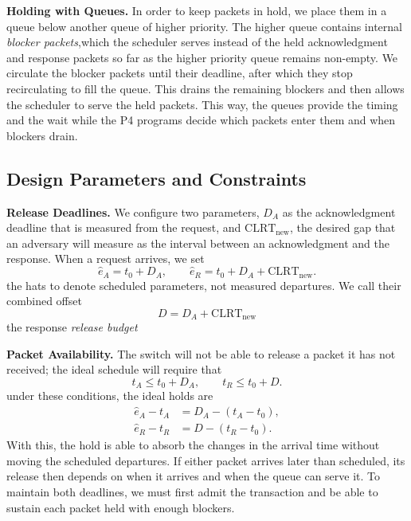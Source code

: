 \documentclass[conference]{IEEEtran}
\begin{document}
\textbf{Holding with Queues.} In order to keep packets in hold, we place them in a queue below another queue of higher priority. The higher queue contains internal \emph{blocker packets},which the scheduler serves instead of the held acknowledgment and response packets so far as the higher priority queue remains non-empty. We circulate the blocker packets until their deadline, after which they stop recirculating to fill the queue. This drains the remaining blockers and then allows the scheduler to serve the held packets. This way, the queues provide the timing and the wait while the P4 programs decide which packets enter them and when blockers drain.

\subsection{Design Parameters and Constraints}
\label{sec:design:read}

\textbf{Release Deadlines.} We configure two parameters, $D_A$ as the acknowledgment deadline that is measured from the request, and $\mathrm{CLRT}_{\mathrm{new}}$, the desired gap that an adversary will measure as the interval between an acknowledgment and the response. When a request arrives, we set
\begin{equation}
\label{eq:schedule}
\hat{e}_A=t_0+D_A, \qquad
\hat{e}_R=t_0+D_A+\mathrm{CLRT}_{\mathrm{new}}.
\end{equation}
the hats to denote scheduled parameters, not measured departures. We call their combined offset
\begin{equation}
\label{eq:budget}
D=D_A+\mathrm{CLRT}_{\mathrm{new}}
\end{equation}
the response \emph{release budget}

\textbf{Packet Availability.} The switch will not be able to release a packet it has not received; the ideal schedule will require that
\begin{equation}
\label{eq:availability}
t_A\leq t_0+D_A, \qquad t_R\leq t_0+D.
\end{equation}
under these conditions, the ideal holds are
\begin{equation}
\label{eq:coupling}
\begin{aligned}
\hat{e}_A-t_A &= D_A-(t_A-t_0),\\
\hat{e}_R-t_R &= D-(t_R-t_0).
\end{aligned}
\end{equation}
With this, the hold is able to absorb the changes in the arrival time without moving the scheduled departures. If either packet arrives later than scheduled, its release then depends on when it arrives and when the queue can serve it. To maintain both deadlines, we must first admit the transaction and be able to sustain each packet held with enough blockers.
\end{document}

